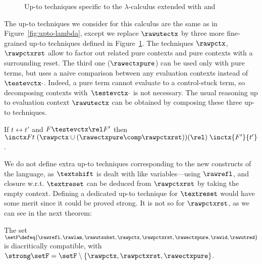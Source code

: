 \documentclass{lmcs}
\theoremstyle{defC}
\begin{document}
\begin{figure}
\caption{Up-to techniques specific to the $\lambda$-calculus extended with
  \textshift{} and \textreset{}}%
\label{fig:upto-shift}
\end{figure}

The up-to techniques we consider for this calculus are the same as in
Figure~\ref{fig:upto-lambda}, except we replace $\rawutectx$ by three
more fine-grained up-to techniques defined in
Figure~\ref{fig:upto-shift}. The techniques $\rawpctx$, $\rawpctxrst$
allow to factor out related pure contexts and pure contexts with a
surrounding reset. The third one ($\rawectxpure$) can be used only
with pure terms, but uses a naive comparison between any evaluation
contexts instead of~$\testevctx\cdot$.  Indeed, a pure term cannot
evaluate to a control-stuck term, so decomposing contexts
with~$\testevctx\cdot$ is not necessary. The usual reasoning up to
evaluation context $\rawutectx$ can be obtained by composing these
three up-to techniques.

\begin{lem}
If $t \rel t'$ and $F \testevctx\rel F'$ then
$\inctx F t \mathrel{(\rawpctx \cup (\rawectxpure\comp\rawpctxrst))(\rel)} \inctx{F'}{t'}$.
\end{lem}

\noindent We do not define extra up-to techniques corresponding to the new
constructs of the language, as $\textshift$ is dealt with like variables---using
$\rawrefl$, and closure w.r.t. $\textreset$ can be deduced from $\rawpctxrst$ by
taking the empty context. Defining a dedicated up-to technique for $\textreset$
would have some merit since it could be proved strong. It is not so for
$\rawpctxrst$, as we can see in the next theorem:

\begin{thm}%
  \label{t:compatible-shift}
  The set $\setF \defeq \{ \rawrefl, \rawlam, \rawutsubst,
  \rawpctx, \rawpctxrst, \rawectxpure, \rawid, \rawutred\}$ is
  diacritically compatible, with $\strong \setF = \setF \setminus \{
  \rawpctx, \rawpctxrst, \rawectxpure \}$.
\end{thm}
\end{document}
